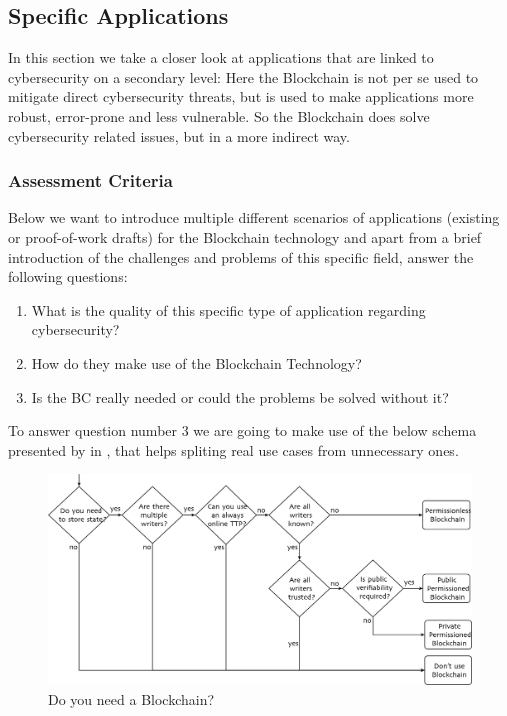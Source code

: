 \subsection{Specific Applications}
\label{subsec:03_applications}

In this section we take a closer look at applications that are linked to cybersecurity on a secondary level: Here the Blockchain is not per se used to mitigate direct cybersecurity threats, but is used to make applications more robust, error-prone and less vulnerable. So the Blockchain does solve cybersecurity related issues, but in a more indirect way.

\subsubsection{Assessment Criteria}
Below we want to introduce multiple different scenarios of applications (existing or proof-of-work drafts) for the Blockchain technology and apart from a brief introduction of the challenges and problems of this specific field, answer the following questions:
\begin{enumerate}
	\item What is the quality of this specific type of application regarding cybersecurity? 
	\item How do they make use of the Blockchain Technology?
	\item Is the BC really needed or could the problems be solved without it? 
\end{enumerate}
To answer question number 3 we are going to make use of the below schema presented by \citeauthor{Wust2017} in \cite{Wust2017}, that helps spliting real use cases from unnecessary ones.
\begin{figure}[ht!]
  \begin{center}
  \includegraphics[scale=0.6]{Talk7/img/app/BCorNot}
  \end{center}
  \caption{Do you need a Blockchain?}
  \label{blockchain_or_not}
\end{figure}

